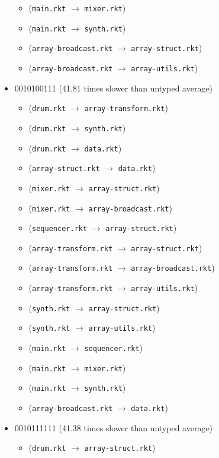\documentclass{article}
\newcommand{\mono}[1]{\texttt{#1}}
\begin{document}
\begin{itemize}
\begin{itemize}
  \item (\mono{main.rkt} $\rightarrow$ \mono{mixer.rkt})
  \item (\mono{main.rkt} $\rightarrow$ \mono{synth.rkt})
  \item (\mono{array-broadcast.rkt} $\rightarrow$ \mono{array-struct.rkt})
  \item (\mono{array-broadcast.rkt} $\rightarrow$ \mono{array-utils.rkt})
  \end{itemize}
\item 0010100111 (41.81 times slower than untyped average)
  \begin{itemize}
  \item (\mono{drum.rkt} $\rightarrow$ \mono{array-transform.rkt})
  \item (\mono{drum.rkt} $\rightarrow$ \mono{synth.rkt})
  \item (\mono{drum.rkt} $\rightarrow$ \mono{data.rkt})
  \item (\mono{array-struct.rkt} $\rightarrow$ \mono{data.rkt})
  \item (\mono{mixer.rkt} $\rightarrow$ \mono{array-struct.rkt})
  \item (\mono{mixer.rkt} $\rightarrow$ \mono{array-broadcast.rkt})
  \item (\mono{sequencer.rkt} $\rightarrow$ \mono{array-struct.rkt})
  \item (\mono{array-transform.rkt} $\rightarrow$ \mono{array-struct.rkt})
  \item (\mono{array-transform.rkt} $\rightarrow$ \mono{array-broadcast.rkt})
  \item (\mono{array-transform.rkt} $\rightarrow$ \mono{array-utils.rkt})
  \item (\mono{synth.rkt} $\rightarrow$ \mono{array-struct.rkt})
  \item (\mono{synth.rkt} $\rightarrow$ \mono{array-utils.rkt})
  \item (\mono{main.rkt} $\rightarrow$ \mono{sequencer.rkt})
  \item (\mono{main.rkt} $\rightarrow$ \mono{mixer.rkt})
  \item (\mono{main.rkt} $\rightarrow$ \mono{synth.rkt})
  \item (\mono{array-broadcast.rkt} $\rightarrow$ \mono{data.rkt})
  \end{itemize}
\item 0010111111 (41.38 times slower than untyped average)
  \begin{itemize}
  \item (\mono{drum.rkt} $\rightarrow$ \mono{array-struct.rkt})

\end{itemize}
\end{itemize}
\end{document}

